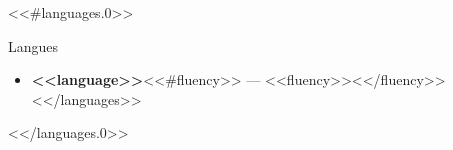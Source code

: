 \documentclass[a4paper]{mcdowellcv}
\begin{document}
  <<#languages.0>>
  \begin{cvsection}{Langues}
    \begin{cvsubsection}{}{}{}
      \begin{itemize}
      <<#languages>>
        \item \textbf{<<language>>}<<#fluency>> --- <<fluency>><</fluency>>
      <</languages>>
      \end{itemize}
    \end{cvsubsection}
  \end{cvsection}
  <</languages.0>>
\end{document}
